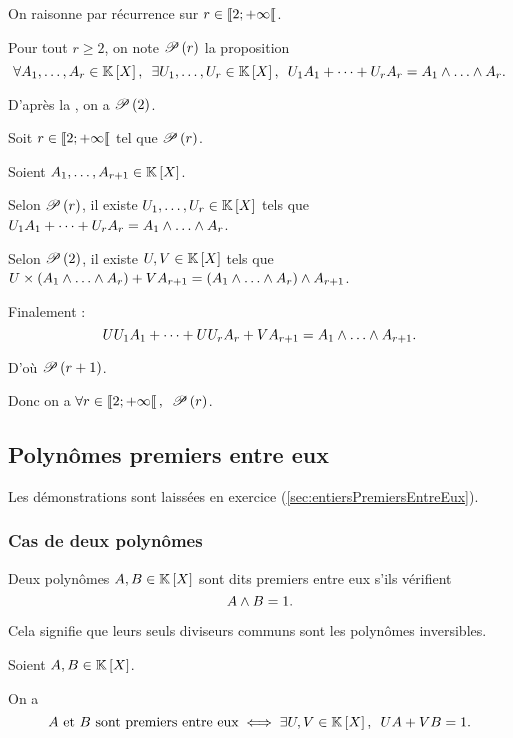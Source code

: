 \begin{dem}
On raisonne par récurrence sur \(r\in\interventierie{2}{\pinf}\).

Pour tout \(r\geq2\), on note \(\P{r}\) la proposition \[\quantifs{\forall A_1,\dots,A_r\in\poly;\exists U_1,\dots,U_r\in\poly}U_1A_1+\dots+U_rA_r=A_1\et\dots\et A_r.\]

D'après la , on a \(\P{2}\).

Soit \(r\in\interventierie{2}{\pinf}\) tel que \(\P{r}\).

Soient \(A_1,\dots,A_{r+1}\in\poly\).

Selon \(\P{r}\), il existe \(U_1,\dots,U_r\in\poly\) tels que \(U_1A_1+\dots+U_rA_r=A_1\et\dots\et A_r\).

Selon \(\P{2}\), il existe \(U,V\in\poly\) tels que \(U\times\paren{A_1\et\dots\et A_r}+VA_{r+1}=\paren{A_1\et\dots\et A_r}\et A_{r+1}\).

Finalement : \[UU_1A_1+\dots+UU_rA_r+VA_{r+1}=A_1\et\dots\et A_{r+1}.\]

D'où \(\P{r+1}\).

Donc on a \(\quantifs{\forall r\in\interventierie{2}{\pinf}}\P{r}\).
\end{dem}

\subsection{Polynômes premiers entre eux}

Les démonstrations sont laissées en exercice (\cf \ref{sec:entiersPremiersEntreEux}).

\subsubsection{Cas de deux polynômes}

\begin{defi}
Deux polynômes \(A,B\in\poly\) sont dits premiers entre eux s'ils vérifient \[A\et B=1.\]

Cela signifie que leurs seuls diviseurs communs sont les polynômes inversibles.
\end{defi}

\begin{theo}
Soient \(A,B\in\poly\).

On a \[A\text{ et }B\text{ sont premiers entre eux}\ssi\quantifs{\exists U,V\in\poly}UA+VB=1.\]
\end{theo}

